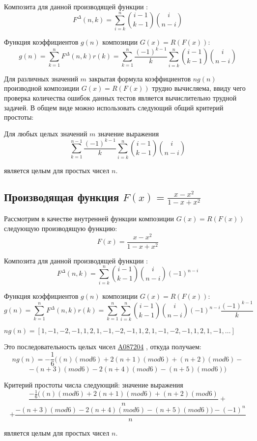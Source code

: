 \documentclass[
russian,
cp1251,
14pt,
simple
]{eskdtext}
\theoremstyle{definition}
\begin{document}
Композита для данной производящей функции \cite{KruchininVV}:
$$
F^\Delta(n,k)=\sum\limits _{i=k}^{n} {i-1 \choose k-1}{i \choose n-i}
$$

Функция коэффициентов $g(n)$ композиции $G(x)=R(F(x))$:
$$
g(n)=\sum\limits _{k=1}^{n}{F^\Delta(n,k)r(k)}=\sum\limits _{k=1}^{n}\frac{(-1)^{k-1}}{k} 
\sum\limits _{i=k}^{n} {i-1 \choose k-1}{i \choose n-i}
$$

Для различных значений $m$ закрытая формула коэффициентов $ng(n)$ производной композиции $G(x)=R(F(x))$ трудно вычисляема, ввиду чего проверка количества ошибок данных тестов является вычислительно трудной задачей. В общем виде можно использовать следующий общий критерий простоты:

Для любых целых значений $m$ значение выражения
$$
\sum\limits _{k=1}^{n-1}\frac{(-1)^{k-1}}{k} 
\sum\limits _{i=k}^{n} {i-1 \choose k-1}{i \choose n-i}
$$

является целым для простых чисел $n$.

\subsection{Производящая функция $F(x)=\frac{x-x^2}{1-x+x^2}$}
Рассмотрим в качестве внутренней функции композиции $G(x)=R(F(x))$ следующую производящую функцию:
$$
F(x)=\frac{x-x^2}{1-x+x^2}
$$

Композита для данной производящей функции \cite{KruchininVV}:
$$
F^\Delta(n,k)=\sum_{i=k}^{n}{{i-1 \choose k-1} {i \choose n-i} (-1)^{n-i}}
$$

Функция коэффициентов $g(n)$ композиции $G(x)=R(F(x))$:
$$
g(n)=\sum^{n}_{k=1}{F^\Delta(n,k)r(k)}=\sum^{n}_{k=1}{\sum_{i=k}^{n}{{i-1 \choose k-1} {i \choose n-i} (-1)^{n-i}} \frac{(-1)^{k-1}}{k}}
$$

\begin{math}
ng(n)=[1,-1,-2,-1,1,2,1,-1,-2,-1,1,2,1,-1,-2,-1,1,2,1,-1,\ldots]
\end{math}

Это последовательность целых чисел \href{http://oeis.org/A087204}{A087204} \cite{oeis}, откуда получаем:
$$
ng(n)=-\frac{1}{6} ( (n)(mod 6) + 2 (n+1)(mod 6) + (n+2)(mod 6) -
$$
$$- (n+3)(mod 6) - 2 (n+4)(mod 6) - (n+5)(mod 6))
$$

Критерий простоты числа следующий: значение выражения
$$
\frac{-\frac{1}{6} ( (n)(mod 6) + 2 (n+1)(mod 6) + (n+2)(mod 6)}{n} +
$$
$$+ \frac{-(n+3)(mod 6) - 2 (n+4)(mod 6) - (n+5)(mod 6)) - (-1)^n}{n}
$$

является целым для простых чисел $n$.
\end{document}
